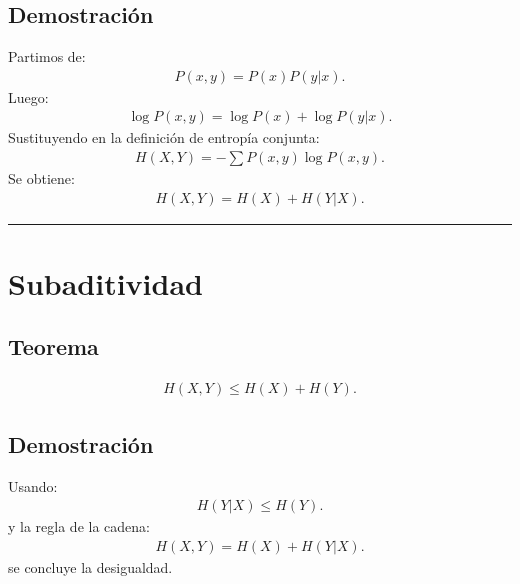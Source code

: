 \documentclass[letterpaper,10pt,english]{jupyterBook}
\begin{document}
\subsection{Demostración}
\label{\detokenize{02_mathematical_foundations/properties_theorems:id3}}
\sphinxAtStartPar
Partimos de:
\begin{equation*}
\begin{split}
P(x,y)=P(x)P(y|x).
\end{split}
\end{equation*}
\sphinxAtStartPar
Luego:
\begin{equation*}
\begin{split}
\log P(x,y)=\log P(x)+\log P(y|x).
\end{split}
\end{equation*}
\sphinxAtStartPar
Sustituyendo en la definición de entropía conjunta:
\begin{equation*}
\begin{split}
H(X,Y)=-\sum P(x,y)\log P(x,y).
\end{split}
\end{equation*}
\sphinxAtStartPar
Se obtiene:
\begin{equation*}
\begin{split}
H(X,Y)=H(X)+H(Y|X).
\end{split}
\end{equation*}

\bigskip\hrule\bigskip



\section{Subaditividad}
\label{\detokenize{02_mathematical_foundations/properties_theorems:subaditividad}}

\subsection{Teorema}
\label{\detokenize{02_mathematical_foundations/properties_theorems:id4}}\begin{equation*}
\begin{split}
H(X,Y)\le H(X)+H(Y).
\end{split}
\end{equation*}

\subsection{Demostración}
\label{\detokenize{02_mathematical_foundations/properties_theorems:id5}}
\sphinxAtStartPar
Usando:
\begin{equation*}
\begin{split}
H(Y|X)\le H(Y).
\end{split}
\end{equation*}
\sphinxAtStartPar
y la regla de la cadena:
\begin{equation*}
\begin{split}
H(X,Y)=H(X)+H(Y|X).
\end{split}
\end{equation*}
\sphinxAtStartPar
se concluye la desigualdad.
\end{document}
